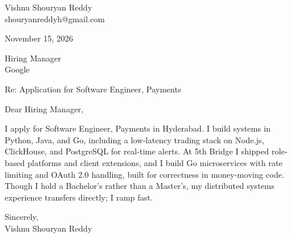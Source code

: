 \documentclass[a4paper,11pt]{article}
\begin{document}
\pagestyle{empty}
Vishnu Shouryan Reddy \\
shouryanreddyh@gmail.com

\vspace{1em}
November 15, 2026

\vspace{1em}
Hiring Manager \\
Google

\vspace{1em}
Re: Application for Software Engineer, Payments

\vspace{1em}
Dear Hiring Manager,

\vspace{0.5em}
I apply for Software Engineer, Payments in Hyderabad. I build systems in Python, Java, and Go, including a low-latency trading stack on Node.js, ClickHouse, and PostgreSQL for real-time alerts. At 5th Bridge I shipped role-based platforms and client extensions, and I build Go microservices with rate limiting and OAuth 2.0 handling, built for correctness in money-moving code. Though I hold a Bachelor's rather than a Master's, my distributed systems experience transfers directly; I ramp fast.

\vspace{1em}
Sincerely, \\
Vishnu Shouryan Reddy
\end{document}
